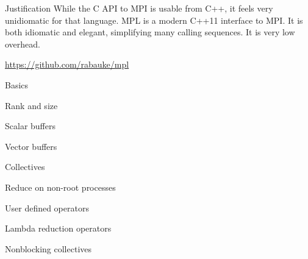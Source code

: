
\begin{frame}{Justification}
  While the C API to MPI is usable from C++, it feels very unidiomatic
  for that language.
  \acf{MPL} is a modern C++11 interface to MPI.
  It is both idiomatic and elegant, simplifying many calling sequences.
  It is very low overhead.

  \url{https://github.com/rabauke/mpl}

\end{frame}

 {Basics}

\begin{numberedframe}{Rank and size}
  
\end{numberedframe}

\begin{numberedframe}{Scalar buffers}
  
\end{numberedframe}
\begin{numberedframe}{Vector buffers}
  
\end{numberedframe}

 {Collectives}

\begin{numberedframe}{Reduce on non-root processes}
  
\end{numberedframe}
\begin{numberedframe}{User defined operators}
  
\end{numberedframe}
\begin{numberedframe}{Lambda reduction operators}
  
\end{numberedframe}
\begin{numberedframe}{Nonblocking collectives}
  
\end{numberedframe}

